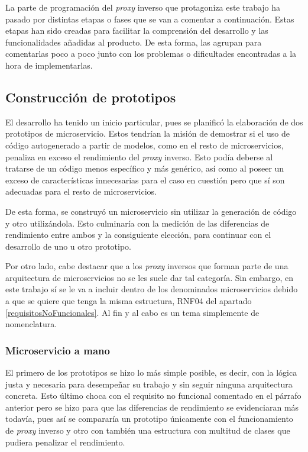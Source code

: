 \documentclass[11pt,spanish,listoffigures]{tfgetsinf}
\begin{document}
La parte de programación del \emph{proxy} inverso que protagoniza este trabajo ha pasado por distintas etapas o fases que se van a comentar a continuación. Estas etapas han sido creadas para facilitar la comprensión del desarrollo y las funcionalidades añadidas al producto. De esta forma, las agrupan para comentarlas poco a poco junto con los problemas o dificultades encontradas a la hora de implementarlas.


		\subsection{Construcción de prototipos}

El desarrollo ha tenido un inicio particular, pues se planificó la elaboración de dos prototipos de microservicio. Estos tendrían la misión de demostrar si el uso de código autogenerado a partir de modelos, como en el resto de microservicios, penaliza en exceso el rendimiento del \emph{proxy} inverso. Esto podía deberse al tratarse de un código menos específico y más genérico, así como al poseer un exceso de características innecesarias para el caso en cuestión pero que sí son adecuadas para el resto de microservicios.

De esta forma, se construyó un microservicio sin utilizar la generación de código y otro utilizándola. Esto culminaría con la medición de las diferencias de rendimiento entre ambos y la consiguiente elección, para continuar con el desarrollo de uno u otro prototipo.

Por otro lado, cabe destacar que a los \emph{proxy} inversos que forman parte de una arquitectura de microservicios no se les suele dar tal categoría. Sin embargo, en este trabajo sí se le va a incluir dentro de los denominados microservicios debido a que se quiere que tenga la misma estructura, RNF04 del apartado \ref{requisitosNoFuncionales}. Al fin y al cabo es un tema simplemente de nomenclatura.


			\subsubsection{Microservicio a mano}

El primero de los prototipos se hizo lo más simple posible, es decir, con la lógica justa y necesaria para desempeñar su trabajo y sin seguir ninguna arquitectura concreta. Esto último choca con el requisito no funcional comentado en el párrafo anterior pero se hizo para que las diferencias de rendimiento se evidenciaran más todavía, pues así se compararía un prototipo únicamente con el funcionamiento de \emph{proxy} inverso y otro con también una estructura con multitud de clases que pudiera penalizar el rendimiento.
\end{document}
